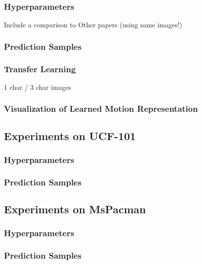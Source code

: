 \subsubsection{Hyperparameters}

Include a comparison to Other papers (using same images!)

\subsubsection{Prediction Samples}

\subsubsection{Transfer Learning}

1 char / 3 char images

\subsubsection{Visualization of Learned Motion Representation}


\subsection{Experiments on UCF-101}

\subsubsection{Hyperparameters}

\subsubsection{Prediction Samples}


\subsection{Experiments on MsPacman}

\subsubsection{Hyperparameters}

\subsubsection{Prediction Samples}






